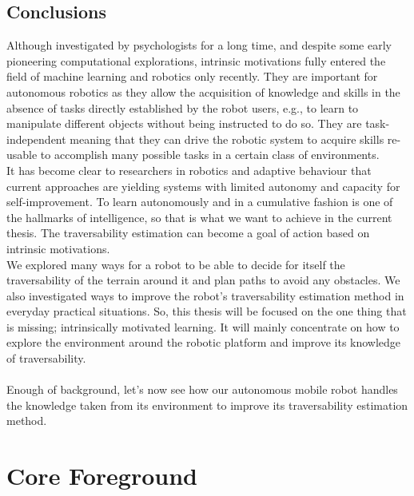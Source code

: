 \documentclass[12pt,a4paper]{report}
\begin{document}
	\section{Conclusions}
	\label{sec:bg:concl}
	
	Although investigated by psychologists for a long time, and despite some early 
	pioneering computational explorations, intrinsic motivations fully entered the 
	field of machine learning and robotics only recently. They are important for 
	autonomous robotics as they allow the acquisition of knowledge and skills in the 
	absence of tasks directly established by the robot users, e.g., to learn to 
	manipulate different objects without being instructed to do so. They are 
	task-independent meaning that they can drive the robotic system to acquire skills 
	re-usable to accomplish many possible tasks in a certain class of environments.
	\\
	
	It has become clear to researchers in robotics and adaptive behaviour that 
	current approaches are yielding systems with limited autonomy and capacity for 
	self-improvement. To learn autonomously and in a cumulative fashion is one of 
	the hallmarks of intelligence, so that is what we want to achieve in the current 
	thesis. The traversability estimation can become a goal of action based on 
	intrinsic motivations.
	\\
	
	We explored many ways for a robot to be able to decide for itself the 
	traversability of the terrain around it and plan paths to avoid any obstacles. 
	We also investigated ways to improve the robot's traversability estimation 
	method in everyday practical situations. So, this thesis will be focused on the 
	one thing that is missing; intrinsically motivated learning. It will mainly 
	concentrate on how to explore the environment around the robotic platform and 
	improve its knowledge of traversability.
	\\\\
	
	Enough of background, let’s now see how our autonomous mobile robot handles the 
	knowledge taken from its environment to improve	its traversability estimation method.
	\\
	
	\chapter{Core Foreground}
	\label{sec:fg}
	
\end{document}
